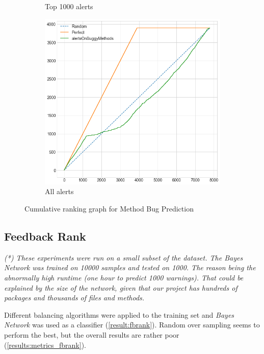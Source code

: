 \begin{figure}[H]
\begin{subfigure}{.5\textwidth}
		\caption{Top 1000 alerts}\label{}
	\end{subfigure}%
	\begin{subfigure}{.5\textwidth}
		\centering
		\includegraphics[scale=0.3]{./src/methodBug/methodbug_cumulative_graph_all.png}
		\caption{All alerts}\label{}
	\end{subfigure}
	\caption{Cumulative ranking graph for Method Bug Prediction}
	\label{results:cumulative_bugprediction}
\end{figure}

\subsection{Feedback Rank}

\textit{(*) These experiments were run on a small subset of the dataset. The Bayes Network was trained on 10000 samples and tested on 1000. The reason being the abnormally high runtime (one hour to predict 1000 warnings). That could be explained by the size of the network, given that our project has hundreds of packages and thousands of files and methods.}

Different balancing algorithms were applied to the training set and \textit{Bayes Network} was used as a classifier (\cref{result:fbrank}). Random over sampling seems to perform the best, but the overall results are rather poor (\cref{results:metrics_fbrank}).

